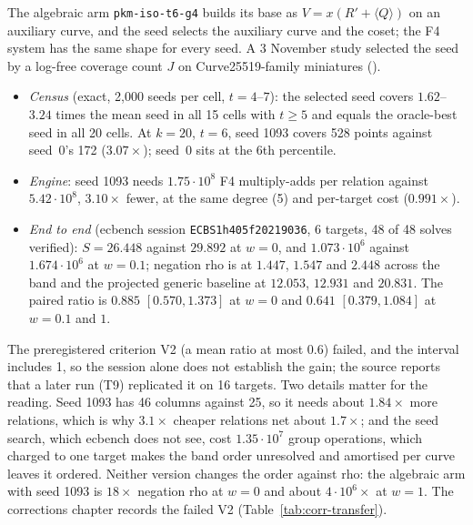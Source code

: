 The algebraic arm \texttt{pkm-iso-t6-g4} builds its base as
$V=x(R'+\langle Q\rangle)$ on an auxiliary curve, and the seed selects the
auxiliary curve and the coset; the F4 system has the same shape for every
seed. A 3 November study selected the seed by a log-free coverage count $J$
on Curve25519-family miniatures
().
\begin{itemize}
\item \emph{Census} (exact, 2{,}000 seeds per cell, $t=4$--$7$): the
  selected seed covers $1.62$--$3.24$ times the mean seed in all 15 cells
  with $t\ge5$ and equals the oracle-best seed in all 20 cells. At $k=20$,
  $t=6$, seed 1093 covers 528 points against seed~0's 172 ($3.07\times$);
  seed~0 sits at the 6th percentile.
\item \emph{Engine}: seed 1093 needs $1.75\cdot10^8$ F4 multiply-adds per
  relation against $5.42\cdot10^8$, $3.10\times$ fewer, at the same degree
  (5) and per-target cost ($0.991\times$).
\item \emph{End to end} (ecbench session \texttt{ECBS1h405f20219036}, 6
  targets, 48 of 48 solves verified): $S=26.448$ against $29.892$ at $w=0$,
  and $1.073\cdot10^6$ against $1.674\cdot10^6$ at $w=0.1$; negation rho
  is at $1.447$, $1.547$ and $2.448$ across the band and the projected
  generic baseline at $12.053$, $12.931$ and $20.831$. The paired ratio is
  $0.885$ $[0.570,1.373]$ at $w=0$ and $0.641$ $[0.379,1.084]$ at
  $w=0.1$ and $1$.
\end{itemize}
The preregistered criterion V2 (a mean ratio at most $0.6$) failed, and the
interval includes 1, so the session alone does not establish the gain; the
source reports that a later run (T9) replicated it on 16 targets. Two
details matter for the reading. Seed 1093 has 46 columns against 25, so it
needs about $1.84\times$ more relations, which is why $3.1\times$ cheaper
relations net about $1.7\times$; and the seed search, which ecbench does not
see, cost $1.35\cdot10^7$ group operations, which charged to one target
makes the band order unresolved and amortised per curve leaves it ordered.
Neither version changes the order against rho: the algebraic arm with seed 1093 is
$18\times$ negation rho at $w=0$ and about $4\cdot10^6\times$ at $w=1$. The corrections chapter records the
failed V2 (Table~\ref{tab:corr-transfer}).

